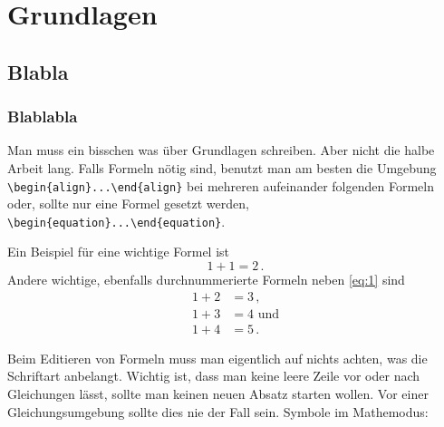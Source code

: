 \chapter{Grundlagen}
\begingroup
\color{blue}
\section{Blabla}
\subsection{Blablabla}
Man muss ein bisschen was über Grundlagen schreiben. Aber nicht die halbe Arbeit
lang. Falls Formeln nötig sind, benutzt man am besten die Umgebung
\verb|\begin{align}|\hskip0pt\verb|...|\hskip0pt\verb|\end{align}|
bei mehreren aufeinander folgenden Formeln oder, sollte nur eine Formel gesetzt
werden, 
\verb|\begin{equation}|\hskip0pt\verb|...|\hskip0pt\verb|\end{equation}|.

Ein Beispiel für eine wichtige Formel ist
\begin{equation}
  1+1 = 2\,\text{.}
  \label{eq:1}
\end{equation}
Andere wichtige, ebenfalls durchnummerierte Formeln neben \autoref{eq:1} sind
\begin{align}
  1+2 &= 3\,\text{,}\label{eq:2}\\
  1+3 &= 4\text{ und}\label{eq:3}\\
  1+4 &= 5\,\text{.}\label{eq:4}
\end{align}

Beim Editieren von Formeln muss man eigentlich auf nichts achten, was die
Schriftart anbelangt. Wichtig ist, dass man keine leere Zeile vor oder nach
Gleichungen lässt, sollte man keinen neuen Absatz starten wollen. Vor einer
Gleichungsumgebung sollte dies nie der Fall sein.
\newpage
Symbole im Mathemodus:

